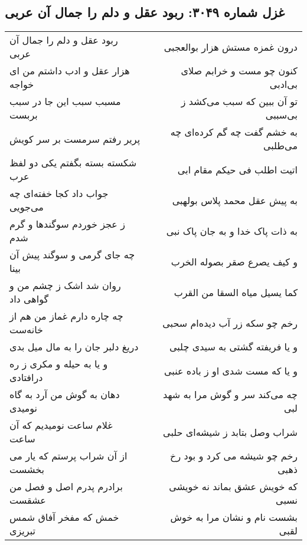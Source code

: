\begin{center}
\section*{غزل شماره ۳۰۴۹: ربود عقل و دلم را جمال آن عربی}
\label{sec:3049}
\begin{longtable}{l p{0.5cm} r}
ربود عقل و دلم را جمال آن عربی
&&
درون غمزه مستش هزار بوالعجبی
\\
هزار عقل و ادب داشتم من ای خواجه
&&
کنون چو مست و خرابم صلای بی‌ادبی
\\
مسبب سبب این جا در سبب بربست
&&
تو آن ببین که سبب می‌کشد ز بی‌سببی
\\
پریر رفتم سرمست بر سر کویش
&&
به خشم گفت چه گم کرده‌ای چه می‌طلبی
\\
شکسته بسته بگفتم یکی دو لفظ عرب
&&
اتیت اطلب فی حیکم مقام ابی
\\
جواب داد کجا خفته‌ای چه می‌جویی
&&
به پیش عقل محمد پلاس بولهبی
\\
ز عجز خوردم سوگندها و گرم شدم
&&
به ذات پاک خدا و به جان پاک نبی
\\
چه جای گرمی و سوگند پیش آن بینا
&&
و کیف یصرع صقر بصوله الخرب
\\
روان شد اشک ز چشم من و گواهی داد
&&
کما یسیل میاه السقا من القرب
\\
چه چاره دارم غماز من هم از خانه‌ست
&&
رخم چو سکه زر آب دیده‌ام سحبی
\\
دریغ دلبر جان را به مال میل بدی
&&
و یا فریفته گشتی به سیدی چلبی
\\
و یا به حیله و مکری ز ره درافتادی
&&
و یا که مست شدی او ز باده عنبی
\\
دهان به گوش من آرد به گاه نومیدی
&&
چه می‌کند سر و گوش مرا به شهد لبی
\\
غلام ساعت نومیدیم که آن ساعت
&&
شراب وصل بتابد ز شیشه‌ای حلبی
\\
از آن شراب پرستم که یار می بخشست
&&
رخم چو شیشه می کرد و بود رخ ذهبی
\\
برادرم پدرم اصل و فصل من عشقست
&&
که خویش عشق بماند نه خویشی نسبی
\\
خمش که مفخر آفاق شمس تبریزی
&&
بشست نام و نشان مرا به خوش لقبی
\\
\end{longtable}
\end{center}
